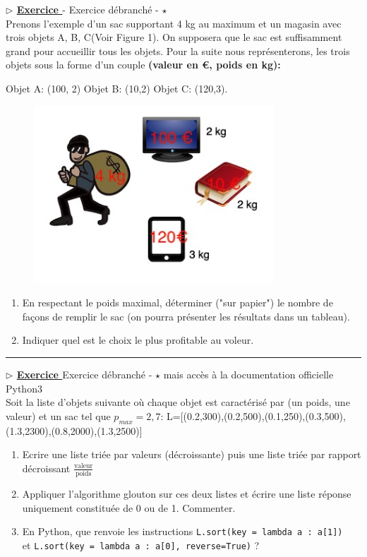 \documentclass[12pt,french]{article}
\newcounter{npb}
\newcommand{\exo}{
    \stepcounter{npb}
    {\textbf{$\triangleright$ \underline{Exercice \arabic{npb} }}}
}
\begin{document}
\medskip
\exo  - Exercice débranché - $\star$ \\
Prenons l'exemple d'un sac supportant 4 kg au maximum et un magasin avec trois objets  A, B, C(Voir Figure 1). On supposera que le sac est suffisamment grand pour accueillir tous les objets.
Pour la suite nous représenterons, les trois objets sous la forme d'un couple  \textbf{(valeur en €, poids en kg):}
\begin{center}   Objet A:  (100, 2)\hspace{1cm} Objet B:  (10,2)\hspace{1cm}  Objet C: (120,3).\end{center}
\begin{figure}[h]
	\centering
	\caption{\label{overflow}}
	\includegraphics[width=90mm]{Sac}
	
\end{figure}
\begin{enumerate}
	
	\item En respectant le poids maximal, déterminer ("sur papier") le nombre de façons de remplir le sac (on pourra présenter les résultats dans un tableau). 
\item Indiquer quel est le choix le plus profitable au voleur.


\end{enumerate}
\hrule
\medskip
\exo Exercice débranché - $\star$  mais accès à la documentation officielle Python3\\
Soit la liste d'objets suivante où chaque objet est caractérisé par (un poids, une valeur) et un sac tel que $p_{max}=2,7$:\newline
L=[(0.2,300),(0.2,500),(0.1,250),(0.3,500),(1.3,2300),(0.8,2000),(1.3,2500)]
\vspace{2mm}
\begin{enumerate}
	\item Ecrire une liste triée par valeurs (décroissante) puis une liste triée par rapport décroissant $\frac{\text{valeur}}{\text{poids}}$

	
	
	\item Appliquer l'algorithme glouton sur ces deux listes et écrire une liste réponse uniquement constituée de 0 ou de 1. Commenter.

	\item En Python, que renvoie les instructions \texttt{L.sort(key = lambda a : a[1])}\\
	 et \texttt{L.sort(key = lambda a : a[0], reverse=True)} ?

\end{enumerate}	
\end{document}
